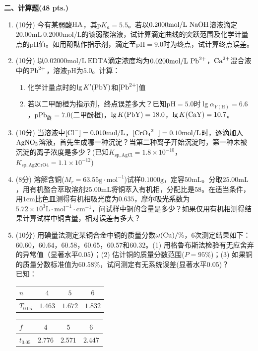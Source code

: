 \vspace{0.5cm}
\noindent\textbf{二、计算题(48 pts.)}

\begin{enumerate}[label=\arabic*., itemsep=1.5ex]
    \item (10分) 今有某弱酸$\ce{HA}$，其$\mathrm{p}K_a=5.5$。若以$0.2000\mathrm{mol/L}\ \ce{NaOH}$溶液滴定$20.00\mathrm{mL}\ 0.2000\mathrm{mol/L}$的该弱酸溶液，试计算滴定曲线的突跃范围及化学计量点的$\mathrm{pH}$值。如用酚酞作指示剂，滴定至$\mathrm{pH}=9.0$时为终点，试计算终点误差。
    \item (10分) 以$0.02000\mathrm{mol/L}\ \mathrm{EDTA}$滴定浓度均为$0.0200\mathrm{mol/L}\ \ce{Pb^{2+}}$，$\ce{Ca^{2+}}$混合液中的$\ce{Pb^{2+}}$，溶液$\mathrm{pH}$为$5.0$。计算：
    \begin{enumerate}[label=(\arabic*), noitemsep, topsep=0pt, partopsep=0pt]
        \item 化学计量点时的$\lg K'(\ce{PbY})$和$[\ce{Pb^{2+}}]$值
        \item 若以二甲酚橙为指示剂，终点误差多大？已知$\mathrm{pH}=5.0$时$\lg\alpha_{Y(\mathrm{H})}=6.6$，$\mathrm{pPb_{终}}=7.0$(二甲酚橙)，$\lg K(\ce{PbY})=18.0$，$\lg K(\ce{CaY})=10.7$。
    \end{enumerate}
    \item (10分) 当溶液中$[\ce{Cl^-}]=0.010\mathrm{mol/L}$，$[\ce{CrO4^{2-}}]=0.10\mathrm{mol/L}$时，逐滴加入$\ce{AgNO3}$溶液，首先生成哪一种沉淀？当第二种离子开始沉淀时，第一种未被沉淀的离子浓度是多少？(已知$K_{\mathrm{sp,AgCl}}=1.8\times10^{-10}$，$K_{\mathrm{sp,Ag2CrO4}}=1.1\times10^{-12}$)
    \item (8分) 溶解含铜($M_r=63.55\mathrm{g\cdot mol^{-1}}$)试样$0.1000\mathrm{g}$，定容$50\mathrm{mL}$。分取$25.00\mathrm{mL}$，用有机螯合萃取溶剂$25.00\mathrm{mL}$将铜萃入有机相，分配比是$58$。在适当条件，用$1\mathrm{cm}$比色皿测得有机相吸光度为$0.635$，摩尔吸光系数为$5.72\times10^3\mathrm{L\cdot mol^{-1}\cdot cm^{-1}}$，问试样中铜的含量是多少？如果仅用有机相测得结果计算试样中铜含量，相对误差有多大？
    \item (10分) 用碘量法测定某铜合金中铜的质量分数$\omega(\ce{Cu})/\%$，$6$次测定结果如下：$60.60$，$60.64$，$60.58$，$60.65$，$60.57$和$60.32$。(1) 用格鲁布斯法检验有无应舍弃的异常值（显著水平$0.05$）；(2) 估计铜的质量分数范围($P=95\%$)；(3) 如果铜的质量分数标准值为$60.58\%$，试问测定有无系统误差(显著水平$0.05$)？
    \\
    已知：
    \begin{center}
    \begin{tabular}{l|ccc}
    $n$ & $4$ & $5$ & $6$ \\
    \hline
    $T_{0.05}$ & $1.463$ & $1.672$ & $1.832$ \\
    \end{tabular}
    \begin{tabular}{l|ccc}
    $f$ & $4$ & $5$ & $6$ \\
    \hline
    $t_{0.05}$ & $2.776$ & $2.571$ & $2.447$ \\
    \end{tabular}
    \end{center}
\end{enumerate}